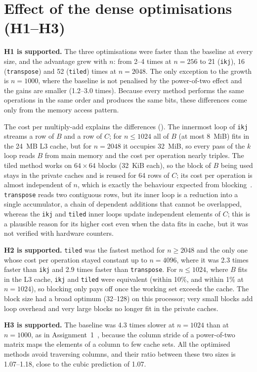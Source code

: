 \documentclass[12pt,a4paper]{report}
\begin{document}
\section{Effect of the dense optimisations (H1--H3)}

\textbf{H1 is supported.} The three optimisations were faster than the baseline at every size, and the advantage grew
with $n$: from 2--4 times at $n = 256$ to 21 (\texttt{ikj}), 16 (\texttt{transpose}) and 52 (\texttt{tiled})
times at $n = 2048$. The only exception to the growth is $n = 1000$, where the baseline is not penalised by the
power-of-two effect and the gains are smaller (1.2--3.0 times). Because every method performs the same operations in
the same order and produces the same bits, these differences come only from the memory access pattern.

The cost per multiply-add explains the differences (). The innermost loop of \texttt{ikj} streams a
row of $B$ and a row of $C$; for $n \leq 1024$ all of $B$ (at most 8~MiB) fits in the 24~MB L3 cache, but for
$n = 2048$ it occupies 32~MiB, so every pass of the $k$ loop reads $B$ from main memory and the cost per operation
nearly triples. The tiled method works on $64 \times 64$ blocks (32~KiB each), so the block of $B$ being used stays in
the private caches and is reused for 64 rows of $C$; its cost per operation is almost independent of $n$, which is
exactly the behaviour expected from blocking~\cite{lam1991,goto2008}. \texttt{transpose} reads two contiguous rows,
but its inner loop is a reduction into a single accumulator, a chain of dependent additions that cannot be overlapped,
whereas the \texttt{ikj} and \texttt{tiled} inner loops update independent elements of $C$; this is a plausible reason
for its higher cost even when the data fits in cache, but it was not verified with hardware counters.

\textbf{H2 is supported.} \texttt{tiled} was the fastest method for $n \geq 2048$ and the only one whose cost per
operation stayed constant up to $n = 4096$, where it was 2.3 times faster than \texttt{ikj} and 2.9 times faster than
\texttt{transpose}. For $n \leq 1024$, where $B$ fits in the L3 cache, \texttt{ikj} and \texttt{tiled} were equivalent
(within 10\%, and within 1\% at $n = 1024$), so blocking only pays off once the working set exceeds the cache. The block size had a broad optimum
(32--128) on this processor; very small blocks add loop overhead and very large blocks no longer fit in the private
caches.

\textbf{H3 is supported.} The baseline was 4.3 times slower at $n = 1024$ than at $n = 1000$, as in
Assignment~1~\cite{a1}, because the column stride of a power-of-two matrix maps the elements of a column to few cache
sets. All the optimised methods avoid traversing columns, and their ratio between these two sizes is 1.07--1.18,
close to the cubic prediction of 1.07.
\end{document}

